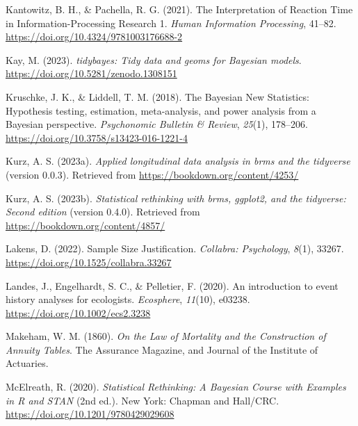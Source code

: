 \documentclass[
  man, donotrepeattitle,floatsintext]{apa6}
\newlength{\cslhangindent}
\newenvironment{CSLReferences}[2] %
 {\begin{list}{}{%
  \setlength{\itemindent}{0pt}
  \setlength{\leftmargin}{0pt}
  \setlength{\parsep}{0pt}
  \ifodd #1
   \setlength{\leftmargin}{\cslhangindent}
   \setlength{\itemindent}{-1\cslhangindent}
  \fi
  \setlength{\itemsep}{#2\baselineskip}}}
 {\end{list}}
\begin{document}
\begin{CSLReferences}{1}{0}
Kantowitz, B. H., \& Pachella, R. G. (2021). The {Interpretation} of {Reaction Time} in {Information-Processing Research} 1. \emph{Human Information Processing}, 41--82. \url{https://doi.org/10.4324/9781003176688-2}

Kay, M. (2023). \emph{{tidybayes}: Tidy data and geoms for {Bayesian} models}. \url{https://doi.org/10.5281/zenodo.1308151}

Kruschke, J. K., \& Liddell, T. M. (2018). The {Bayesian New Statistics}: {Hypothesis} testing, estimation, meta-analysis, and power analysis from a {Bayesian} perspective. \emph{Psychonomic Bulletin \& Review}, \emph{25}(1), 178--206. \url{https://doi.org/10.3758/s13423-016-1221-4}

Kurz, A. S. (2023a). \emph{Applied longitudinal data analysis in brms and the tidyverse} (version 0.0.3). Retrieved from \url{https://bookdown.org/content/4253/}

Kurz, A. S. (2023b). \emph{Statistical rethinking with brms, ggplot2, and the tidyverse: {Second} edition} (version 0.4.0). Retrieved from \url{https://bookdown.org/content/4857/}

Lakens, D. (2022). Sample {Size Justification}. \emph{Collabra: Psychology}, \emph{8}(1), 33267. \url{https://doi.org/10.1525/collabra.33267}

Landes, J., Engelhardt, S. C., \& Pelletier, F. (2020). An introduction to event history analyses for ecologists. \emph{Ecosphere}, \emph{11}(10), e03238. \url{https://doi.org/10.1002/ecs2.3238}

Makeham, W. M. (1860). \emph{On the {Law} of {Mortality} and the {Construction} of {Annuity Tables}}. {The Assurance Magazine, and Journal of the Institute of Actuaries}.

McElreath, R. (2020). \emph{Statistical {Rethinking}: {A Bayesian Course} with {Examples} in {R} and {STAN}} (2nd ed.). New York: {Chapman and Hall/CRC}. \url{https://doi.org/10.1201/9780429029608}


\end{CSLReferences}
\end{document}
